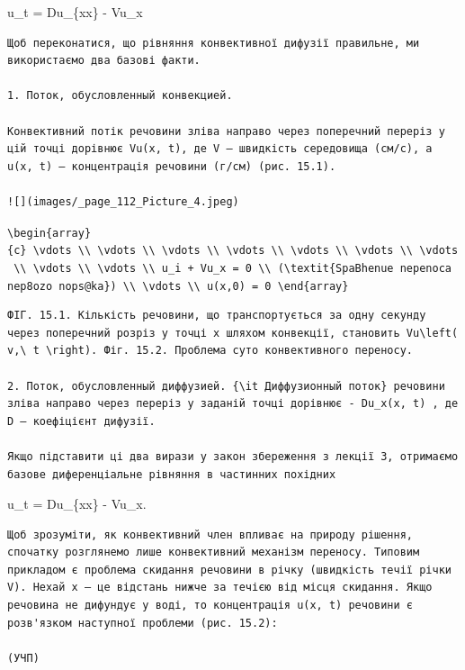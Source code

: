 \documentclass[
  ukrainian,
]{article}
\begin{document}
u\_t = Du\_\{xx\} - Vu\_x

\begin{verbatim}
Щоб переконатися, що рівняння конвективної дифузії правильне, ми використаємо два базові факти.

1. Поток, обусловленный конвекцией.

Конвективний потік речовини зліва направо через поперечний переріз у цій точці дорівнює Vu(x, t), де V — швидкість середовища (см/с), а u(x, t) — концентрація речовини (г/см) (рис. 15.1).

![](images/_page_112_Picture_4.jpeg)
\end{verbatim}

\texttt{\textbackslash{}begin\{array\}\{c\}\ \textbackslash{}vdots\ \textbackslash{}\textbackslash{}\ \textbackslash{}vdots\ \textbackslash{}\textbackslash{}\ \textbackslash{}vdots\ \textbackslash{}\textbackslash{}\ \textbackslash{}vdots\ \textbackslash{}\textbackslash{}\ \textbackslash{}vdots\ \textbackslash{}\textbackslash{}\ \textbackslash{}vdots\ \textbackslash{}\textbackslash{}\ \textbackslash{}vdots\ \textbackslash{}\textbackslash{}\ \textbackslash{}vdots\ \textbackslash{}\textbackslash{}\ \textbackslash{}vdots\ \textbackslash{}\textbackslash{}\ u\_i\ +\ Vu\_x\ =\ 0\ \textbackslash{}\textbackslash{}\ (\textbackslash{}textit\{SpaBhenue\ nepenoca\ nep8ozo\ nops@ka\})\ \textbackslash{}\textbackslash{}\ \textbackslash{}vdots\ \textbackslash{}\textbackslash{}\ u(x,0)\ =\ 0\ \textbackslash{}end\{array\}}

\begin{verbatim}
ФІГ. 15.1. Кількість речовини, що транспортується за одну секунду через поперечний розріз у точці x шляхом конвекції, становить Vu\left( v,\ t \right). Фіг. 15.2. Проблема суто конвективного переносу.

2. Поток, обусловленный диффузией. {\it Диффузионный поток} речовини зліва направо через переріз у заданій точці дорівнює - Du_x(x, t) , де D — коефіцієнт дифузії.

Якщо підставити ці два вирази у закон збереження з лекції 3, отримаємо базове диференціальне рівняння в частинних похідних
\end{verbatim}

u\_t = Du\_\{xx\} - Vu\_x.

\begin{verbatim}
Щоб зрозуміти, як конвективний член впливає на природу рішення, спочатку розглянемо лише конвективний механізм переносу. Типовим прикладом є проблема скидання речовини в річку (швидкість течії річки V). Нехай x — це відстань нижче за течією від місця скидання. Якщо речовина не дифундує у воді, то концентрація u(x, t) речовини є розв'язком наступної проблеми (рис. 15.2):

(УЧП)
\end{verbatim}
\end{document}
